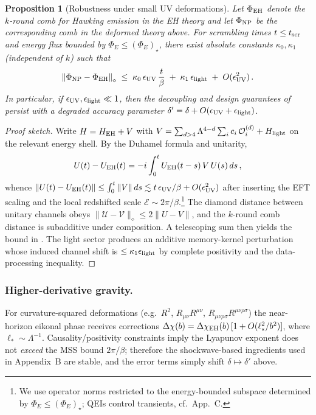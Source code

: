 \documentclass[aps,prd,preprint,onecolumn,superscriptaddress,nofootinbib,longbibliography,floatfix,11pt,showpacs,showkeys]{revtex4-2}
\newcommand{\normD}[1]{\left\lVert #1 \right\rVert_{\diamond}}
\newcommand{\Eflux}{\Phi_E}
\newcommand{\Ddiamond}[1]{\normD{#1}}
\theoremstyle{plain}
\newtheorem{proposition}[theorem]{Proposition}
\theoremstyle{definition}
\theoremstyle{remark}
\begin{document}
\begin{proposition}[Robustness under small UV deformations]\label{prop:robustness-uv}
Let $\Phi_{\rm EH}$ denote the $k$-round comb for Hawking emission in the EH theory and let $\Phi_{\rm NP}$ be the corresponding comb in the deformed theory above. For scrambling times $t\le t_{\rm scr}$ and energy flux bounded by $\Eflux\le (\Eflux)_\star$, there exist absolute constants $\kappa_0,\kappa_1$ (independent of $k$) such that
\begin{equation}
\Ddiamond{\Phi_{\rm NP}-\Phi_{\rm EH}} \;\le\; \kappa_0\,\epsilon_{\rm UV}\,\frac{t}{\beta}\;+\;\kappa_1\,\epsilon_{\rm light}\;+\;O(\epsilon_{\rm UV}^2)\,.
\end{equation}
In particular, if $\epsilon_{\rm UV},\epsilon_{\rm light}\ll 1$, then the decoupling and design guarantees of  persist with a degraded accuracy parameter $\delta'=\delta+O(\epsilon_{\rm UV}+\epsilon_{\rm light})$.
\end{proposition}

\begin{proof}[Proof sketch]
Write $H=H_{\rm EH}+V$ with $V=\sum_{d>4}\Lambda^{4-d}\sum_i c_i\,\mathcal{O}^{(d)}_i + H_{\rm light}$ on the relevant energy shell. By the Duhamel formula and unitarity,
\begin{equation}
U(t)-U_{\rm EH}(t)= -i\int_0^t U_{\rm EH}(t-s)\,V\,U(s)\,ds\,,
\end{equation}
whence $\|U(t)-U_{\rm EH}(t)\|\le \int_0^t \|V\|\,ds \lesssim t\,\epsilon_{\rm UV}/\beta + O(\epsilon_{\rm UV}^2)$ after inserting the EFT scaling and the local redshifted scale $\mathcal{E}\sim 2\pi/\beta$.\footnote{We use operator norms restricted to the energy-bounded subspace determined by $\Eflux\le (\Eflux)_\star$; QEIs control transients, cf.\ App.~C.} The diamond distance between unitary channels obeys $\|\mathcal{U}-\mathcal{V}\|_\diamond\le 2\|U-V\|$, and the $k$-round comb distance is subadditive under composition. A telescoping sum then yields the bound in . The light sector produces an additive memory-kernel perturbation whose induced channel shift is $\le \kappa_1\epsilon_{\rm light}$ by complete positivity and the data-processing inequality.
\end{proof}

\subsubsection{Higher-derivative gravity.} For curvature-squared deformations (e.g.\ $R^2$, $R_{\mu\nu}R^{\mu\nu}$, $R_{\mu\nu\rho\sigma}R^{\mu\nu\rho\sigma}$) the near-horizon eikonal phase receives corrections $\Delta\chi(b)=\Delta\chi_{\rm EH}(b)\,[1+O(\ell_\ast^2/b^2)]$, where $\ell_\ast\sim \Lambda^{-1}$. Causality/positivity constraints imply the Lyapunov exponent does not \emph{exceed} the MSS bound $2\pi/\beta$; therefore the shockwave-based ingredients used in Appendix~B are stable, and the error terms simply shift $\delta\mapsto\delta'$ above.
\end{document}
